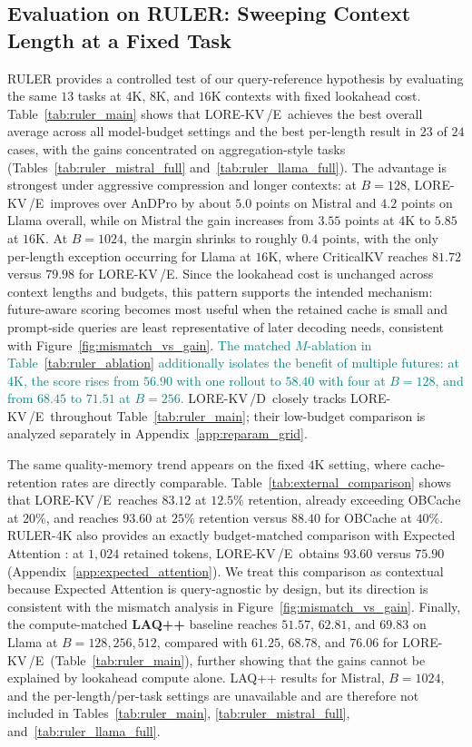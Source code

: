 \documentclass{article} %
\newcommand{\lorekvE}{LORE-KV\,/E}
\newcommand{\lorekvD}{LORE-KV\,/D}
\begin{document}
\subsection{Evaluation on RULER: Sweeping Context Length at a Fixed Task}
\label{subsec:ruler}
RULER provides a controlled test of our query-reference hypothesis by evaluating the same $13$ tasks at $4$K, $8$K, and $16$K contexts with fixed lookahead cost. Table~\ref{tab:ruler_main} shows that \lorekvE\ achieves the best overall average across all model-budget settings and the best per-length result in $23$ of $24$ cases, with the gains concentrated on aggregation-style tasks (Tables~\ref{tab:ruler_mistral_full} and~\ref{tab:ruler_llama_full}). The advantage is strongest under aggressive compression and longer contexts: at $B=128$, \lorekvE\ improves over AnDPro by about $5.0$ points on Mistral and $4.2$ points on Llama overall, while on Mistral the gain increases from $3.55$ points at $4$K to $5.85$ at $16$K. At $B=1024$, the margin shrinks to roughly $0.4$ points, with the only per-length exception occurring for Llama at $16$K, where CriticalKV reaches $81.72$ versus $79.98$ for \lorekvE. Since the lookahead cost is unchanged across context lengths and budgets, this pattern supports the intended mechanism: future-aware scoring becomes most useful when the retained cache is small and prompt-side queries are least representative of later decoding needs, consistent with Figure~\ref{fig:mismatch_vs_gain}. \textcolor{teal}{The matched $M$-ablation in Table~\ref{tab:ruler_ablation} additionally isolates the benefit of multiple futures: at 4K, the score rises from $56.90$ with one rollout to $58.40$ with four at $B=128$, and from $68.45$ to $71.51$ at $B=256$.} \lorekvD\ closely tracks \lorekvE\ throughout Table~\ref{tab:ruler_main}; their low-budget comparison is analyzed separately in Appendix~\ref{app:reparam_grid}.

The same quality-memory trend appears on the fixed $4$K setting, where cache-retention rates are directly comparable. Table~\ref{tab:external_comparison} shows that \lorekvE\ reaches $83.12$ at $12.5\%$ retention, already exceeding OBCache \citep{gu2025obcache} at $20\%$, and reaches $93.60$ at $25\%$ retention versus $88.40$ for OBCache at $40\%$. RULER-4K also provides an exactly budget-matched comparison with Expected Attention \citep{devoto2025expected}: at $1{,}024$ retained tokens, \lorekvE\ obtains $93.60$ versus $75.90$ (Appendix~\ref{app:expected_attention}). We treat this comparison as contextual because Expected Attention is query-agnostic by design, but its direction is consistent with the mismatch analysis in Figure~\ref{fig:mismatch_vs_gain}. Finally, the compute-matched \textbf{LAQ++} baseline \citep{wang2025lookahead} reaches $51.57$, $62.81$, and $69.83$ on Llama at $B=128,256,512$, compared with $61.25$, $68.78$, and $76.06$ for \lorekvE\ (Table~\ref{tab:ruler_main}), further showing that the gains cannot be explained by lookahead compute alone. LAQ++ results for Mistral, $B=1024$, and the per-length/per-task settings are unavailable and are therefore not included in Tables~\ref{tab:ruler_main}, \ref{tab:ruler_mistral_full}, and~\ref{tab:ruler_llama_full}.
\end{document}

